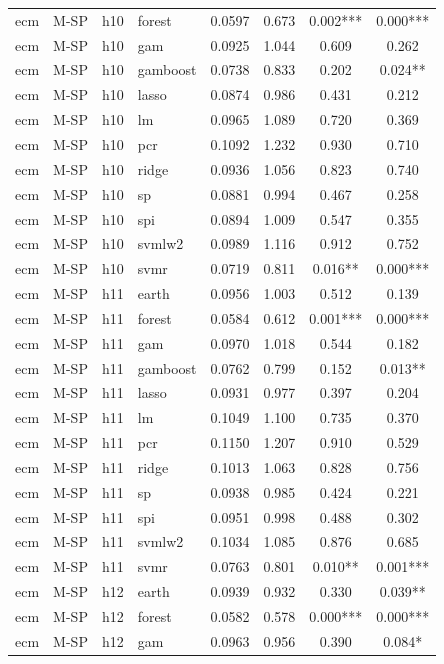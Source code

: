 \begin{ThreePartTable}
\begin{longtable}[t]{llclcccc}
ecm & M-SP & h10 & forest & 0.0597 & 0.673 & 0.002*** & 0.000***\\
ecm & M-SP & h10 & gam & 0.0925 & 1.044 & 0.609 & 0.262\\
ecm & M-SP & h10 & gamboost & 0.0738 & 0.833 & 0.202 & 0.024**\\
ecm & M-SP & h10 & lasso & 0.0874 & 0.986 & 0.431 & 0.212\\
ecm & M-SP & h10 & lm & 0.0965 & 1.089 & 0.720 & 0.369\\
ecm & M-SP & h10 & pcr & 0.1092 & 1.232 & 0.930 & 0.710\\
ecm & M-SP & h10 & ridge & 0.0936 & 1.056 & 0.823 & 0.740\\
ecm & M-SP & h10 & sp & 0.0881 & 0.994 & 0.467 & 0.258\\
ecm & M-SP & h10 & spi & 0.0894 & 1.009 & 0.547 & 0.355\\
ecm & M-SP & h10 & svmlw2 & 0.0989 & 1.116 & 0.912 & 0.752\\
ecm & M-SP & h10 & svmr & 0.0719 & 0.811 & 0.016** & 0.000***\\
\addlinespace
ecm & M-SP & h11 & earth & 0.0956 & 1.003 & 0.512 & 0.139\\
ecm & M-SP & h11 & forest & 0.0584 & 0.612 & 0.001*** & 0.000***\\
ecm & M-SP & h11 & gam & 0.0970 & 1.018 & 0.544 & 0.182\\
ecm & M-SP & h11 & gamboost & 0.0762 & 0.799 & 0.152 & 0.013**\\
ecm & M-SP & h11 & lasso & 0.0931 & 0.977 & 0.397 & 0.204\\
ecm & M-SP & h11 & lm & 0.1049 & 1.100 & 0.735 & 0.370\\
ecm & M-SP & h11 & pcr & 0.1150 & 1.207 & 0.910 & 0.529\\
ecm & M-SP & h11 & ridge & 0.1013 & 1.063 & 0.828 & 0.756\\
ecm & M-SP & h11 & sp & 0.0938 & 0.985 & 0.424 & 0.221\\
ecm & M-SP & h11 & spi & 0.0951 & 0.998 & 0.488 & 0.302\\
ecm & M-SP & h11 & svmlw2 & 0.1034 & 1.085 & 0.876 & 0.685\\
ecm & M-SP & h11 & svmr & 0.0763 & 0.801 & 0.010** & 0.001***\\
\addlinespace
ecm & M-SP & h12 & earth & 0.0939 & 0.932 & 0.330 & 0.039**\\
ecm & M-SP & h12 & forest & 0.0582 & 0.578 & 0.000*** & 0.000***\\
ecm & M-SP & h12 & gam & 0.0963 & 0.956 & 0.390 & 0.084*\\

\end{longtable}
\end{ThreePartTable}
